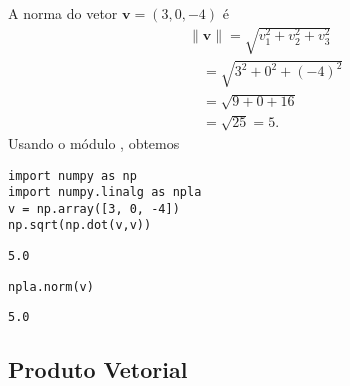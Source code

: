 \begin{ex}
  A norma do vetor $\pmb{v} = (3, 0, -4)$ é
  \begin{align}
    & \|\pmb{v}\| = \sqrt{v_1^2 + v_2^2 + v_3^2} \\
    & \text{}\quad = \sqrt{3^2 + 0^2 + (-4)^2} \\
    & \text{}\quad = \sqrt{9 + 0 + 16} \\
    & \text{}\quad = \sqrt{25} = 5.
  \end{align}
  Usando o módulo {\PYTHONnumpyDOTlinalg}, obtemos

\begin{lstlisting}
import numpy as np
import numpy.linalg as npla
v = np.array([3, 0, -4])
np.sqrt(np.dot(v,v))
\end{lstlisting}

\begin{verbatim}
5.0
\end{verbatim}

\begin{lstlisting}
npla.norm(v)
\end{lstlisting}

\begin{verbatim}
5.0
\end{verbatim}

\end{ex}

\subsection{Produto Vetorial}


